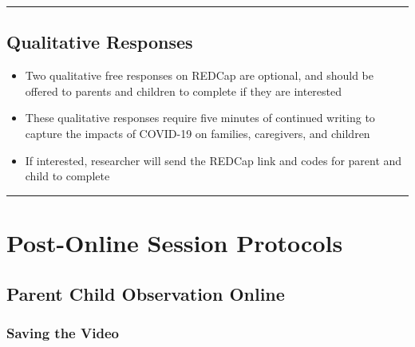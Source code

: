 \documentclass[]{book}
\providecommand{\tightlist}{%
  \setlength{\itemsep}{0pt}\setlength{\parskip}{0pt}}
\begin{document}
\begin{center}\rule{0.5\linewidth}{0.5pt}\end{center}

\hypertarget{qualitative-responses}{%
\subsection{Qualitative Responses}\label{qualitative-responses}}

\begin{itemize}
\tightlist
\item
  Two qualitative free responses on REDCap are optional, and should be offered to parents and children to complete if they are interested
\item
  These qualitative responses require five minutes of continued writing to capture the impacts of COVID-19 on families, caregivers, and children
\item
  If interested, researcher will send the REDCap link and codes for parent and child to complete
\end{itemize}

\begin{center}\rule{0.5\linewidth}{0.5pt}\end{center}

\hypertarget{post-online-session-protocols}{%
\section{Post-Online Session Protocols}\label{post-online-session-protocols}}

\hypertarget{parent-child-observation-online}{%
\subsection{Parent Child Observation Online}\label{parent-child-observation-online}}

\hypertarget{saving-the-video}{%
\subsubsection{Saving the Video}\label{saving-the-video}}
\end{document}
